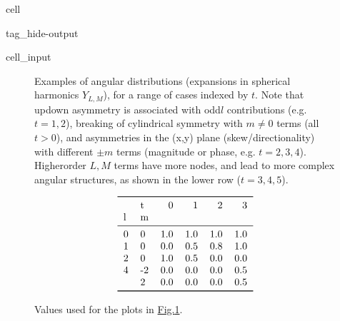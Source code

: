 \documentclass[letterpaper,table,10pt,english]{jupyterBook}
\begin{document}
\begin{sphinxuseclass}{cell}
\begin{sphinxuseclass}{tag_hide-output}
\begin{sphinxVerbatimInput}
\begin{sphinxuseclass}{cell_input}
\begin{sphinxVerbatim}[commandchars=\\\{\}]
 \PYG{p}{[}\PYG{p}{]}   
\end{sphinxVerbatim}

\end{sphinxuseclass}\end{sphinxVerbatimInput}

\end{sphinxuseclass}
\end{sphinxuseclass}
\begin{figure}[htbp]
\centering
\capstart

\noindent{}
\caption{Examples of angular distributions (expansions in spherical harmonics \(Y_{L,M}\)), for a range of cases indexed by \(t\). Note that up\sphinxhyphen{}down asymmetry is associated with odd\sphinxhyphen{}\(l\) contributions (e.g. \(t=1,2\)), breaking of cylindrical symmetry with \(m\neq0\) terms (all \(t>0\)), and asymmetries in the (x,y) plane (skew/directionality) with different \(\pm m\) terms (magnitude or phase, e.g. \(t=2,3,4\)). Higher\sphinxhyphen{}order \(L,M\) terms have more nodes, and lead to more complex angular structures, as shown in the lower row (\(t=3,4,5\)).}\label{\detokenize{part1/theory_observables_intro_211122:fig-pads-example}}\end{figure}

\begin{figure}[htbp]
\centering
\capstart
\begin{equation*}
\begin{split}\begin{tabular}{llrrrr}
\toprule
  & t &    0 &    1 &    2 &    3 \\
l & m &      &      &      &      \\
\midrule
0 &  0 &  1.0 &  1.0 &  1.0 &  1.0 \\
1 &  0 &  0.0 &  0.5 &  0.8 &  1.0 \\
2 &  0 &  1.0 &  0.5 &  0.0 &  0.0 \\
4 & -2 &  0.0 &  0.0 &  0.0 &  0.5 \\
  &  2 &  0.0 &  0.0 &  0.0 &  0.5 \\
\bottomrule
\end{tabular}\end{split}
\end{equation*}\caption{Values used for the plots in \hyperref[\detokenize{part1/theory_observables_intro_211122:fig-pads-example}]{Fig.\@ \ref{\detokenize{part1/theory_observables_intro_211122:fig-pads-example}}}.}\label{\detokenize{part1/theory_observables_intro_211122:blm-tab}}\end{figure}
\end{document}
